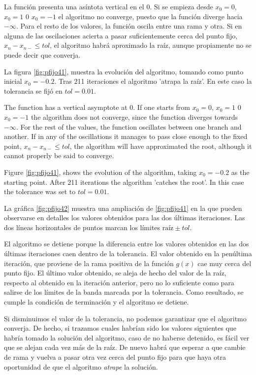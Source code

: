\begin{paracol}{2}
La función presenta una asíntota vertical en el $0$. Si se empieza desde $x_0=0$, $x_0=1$ 0 $x_0=-1$ el algoritmo no converge, puesto que la función diverge hacia $-\infty$. Para el resto de los valores, la función oscila entre una rama y otra. Si en alguna de las oscilaciones acierta a pasar suficientemente cerca del punto fijo, $x_n-x_{n-} \leq tol$, el algoritmo habrá aproximado la raíz, aunque propiamente no se puede decir que converja.

 La figura \ref{fig:pfijo41}, muestra la evolución del algoritmo, tomando como punto inicial $x_0=-0.2$.  Tras 211 iteraciones el algoritmo 'atrapa la raíz'. En este caso la tolerancia se fijó en $tol=0.01$.  
 
 \switchcolumn
 The function has a vertical asymptote at $0$. If one starts from $x_0=0$, $x_0=1$ 0 $x_0=-1$ the algorithm does not converge, since the function diverges towards $-\infty$. For the rest of the values, the function oscillates between one branch and another. If in any of the oscillations it manages to pass close enough to the fixed point, $x_n-x_{n-} \leq tol$, the algorithm will have approximated the root, although it cannot properly be said to converge.

 Figure \ref{fig:pfijo41}, shows the evolution of the algorithm, taking $x_0=-0.2$ as the starting point. After 211 iterations the algorithm 'catches the root'. In this case the tolerance was set to $tol=0.01$.

  \switchcolumn
  
 La gráfica \ref{fig:pfijo42} muestra una ampliación de \ref{fig:pfijo41} en la que pueden observarse en detalles los valores obtenidos para las dos últimas iteraciones. Las dos líneas horizontales de puntos marcan los límites $\text{raíz}\pm tol$. 
 
 El algoritmo se detiene porque la diferencia entre los valores obtenidos en las dos últimas iteraciones caen dentro de la tolerancia. El valor obtenido en la penúltima iteración, que proviene de la rama positiva de la función $g(x)$ cae muy cerca del punto fijo. El último valor obtenido, se aleja de hecho del valor de la raíz, respecto al obtenido en la iteración anterior, pero no lo suficiente como para salirse de los límites de la banda marcada por la tolerancia. Como resultado, se cumple la condición de terminación y el algoritmo se detiene.  
 
 Si disminuimos el valor de la tolerancia, no podemos garantizar que el algoritmo converja. De hecho, si trazamos cuales habrían sido los valores siguientes que habría tomado la solución del algoritmo, caso de no haberse detenido, es fácil ver que se alejan cada vez más de la raíz.  De nuevo habrá que esperar a que cambie de rama y vuelva  a pasar otra vez cerca del punto fijo para que haya otra oportunidad de que el algoritmo \emph{atrape} la solución.
 

\end{paracol}
